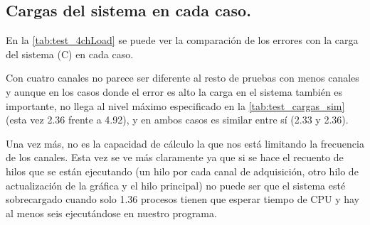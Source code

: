 	   \subsection{Cargas del sistema en cada caso.}
	En la \autoref{tab:test_4chLoad} se puede ver la comparación de los errores con la carga del sistema (C) en cada caso.

  \label{tab:text_4chLoad}
	Con cuatro canales no parece ser diferente al resto de pruebas con menos canales y aunque en los casos donde el error es alto la carga en el sistema también es importante, no llega al nivel máximo especificado en la \autoref{tab:test_cargas_sim} (esta vez 2.36 frente a 4.92), y en ambos casos es similar entre sí (2.33 y 2.36). 
	
	Una vez más, no es la capacidad de cálculo la que nos está limitando la frecuencia de los canales. Esta vez se ve más claramente ya que si se hace el recuento de hilos que se están ejecutando (un hilo por cada canal de adquisición, otro hilo de actualización de la gráfica y el hilo principal) no puede ser que el sistema esté sobrecargado cuando solo 1.36 procesos tienen que esperar tiempo de CPU y hay al menos seis ejecutándose en nuestro programa.

		
